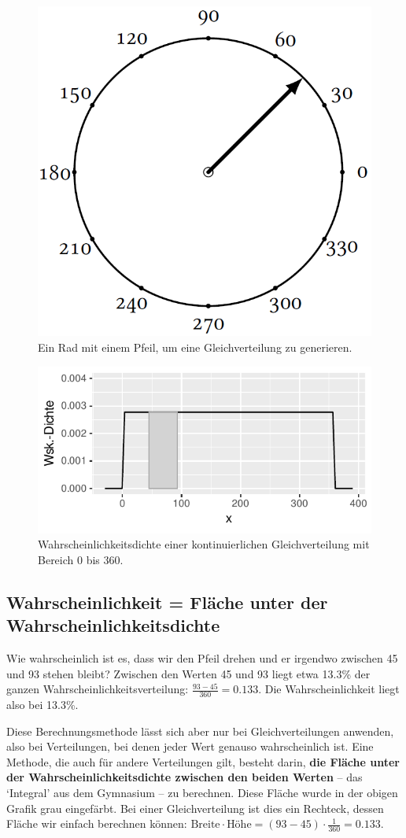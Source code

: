 \documentclass[oneside, 10pt]{book}\usepackage[]{graphicx}\usepackage[]{xcolor}
\newenvironment{knitrout}{}{} %
\begin{document}
\begin{figure}[tp]
\begin{center}
  \includegraphics[width = .33\textwidth]{figs/kreis}
\caption{Ein Rad mit einem Pfeil, um eine Gleichverteilung zu generieren.}
\label{fig:kreis}
\end{center}
\end{figure}

\begin{knitrout}
\color{fgcolor}\begin{figure}[tp]

{\centering \includegraphics[width=.5\textwidth]{figs/unnamed-chunk-120-1} 

}

\caption{Wahrscheinlichkeitsdichte einer kontinuierlichen Gleichverteilung mit Bereich 0 bis 360.\label{fig:kreisdichte}}\label{fig:unnamed-chunk-120}
\end{figure}

\end{knitrout}

\subsection{Wahrscheinlichkeit = Fläche unter der Wahrscheinlichkeitsdichte}
Wie wahrscheinlich ist es, dass wir den Pfeil drehen und er irgendwo
zwischen 45 und 93 stehen bleibt? Zwischen den Werten 45 und 93
liegt etwa 13.3\% der ganzen  Wahrscheinlichkeitsverteilung:
$\frac{93-45}{360} = 0.133$.
Die Wahrscheinlichkeit liegt also bei 13.3\%.

Diese Berechnungsmethode lässt sich aber nur bei Gleichverteilungen
anwenden, also bei Verteilungen, bei denen jeder Wert genauso
wahrscheinlich ist. Eine Methode, die auch für andere Verteilungen
gilt, besteht darin, \textbf{die Fläche unter der Wahrscheinlichkeitsdichte
zwischen den beiden Werten} -- das `Integral' aus dem Gymnasium -- zu berechnen.
Diese Fläche wurde in der obigen Grafik grau eingefärbt.
Bei einer Gleichverteilung ist dies ein Rechteck, dessen Fläche wir einfach berechnen können: $\textrm{Breite} \cdot \textrm{Höhe} = (93-45) \cdot \frac{1}{360} = 0.133$.
\end{document}
